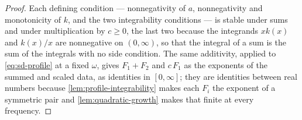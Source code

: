 \begin{proof}
\leanok
Each defining condition --- nonnegativity of $a$, nonnegativity and monotonicity of $k$, and
the two integrability conditions --- is stable under sums and under multiplication by $c \ge 0$,
the last two because the integrands $x k(x)$ and $k(x)/x$ are nonnegative on $(0,\infty)$, so that
the integral of a sum is the sum of the integrals with no side condition. The same additivity,
applied to \ref{eq:sd-profile} at a fixed $\omega$, gives $F_1 + F_2$ and $c\,F_1$ as the exponents of
the summed and scaled data, as identities in $[0,\infty]$; they are identities between real numbers
because \ref{lem:profile-integrability} makes each $F_i$ the exponent of a symmetric \Levy{} pair and
\ref{lem:quadratic-growth} makes that finite at every frequency.
\end{proof}

